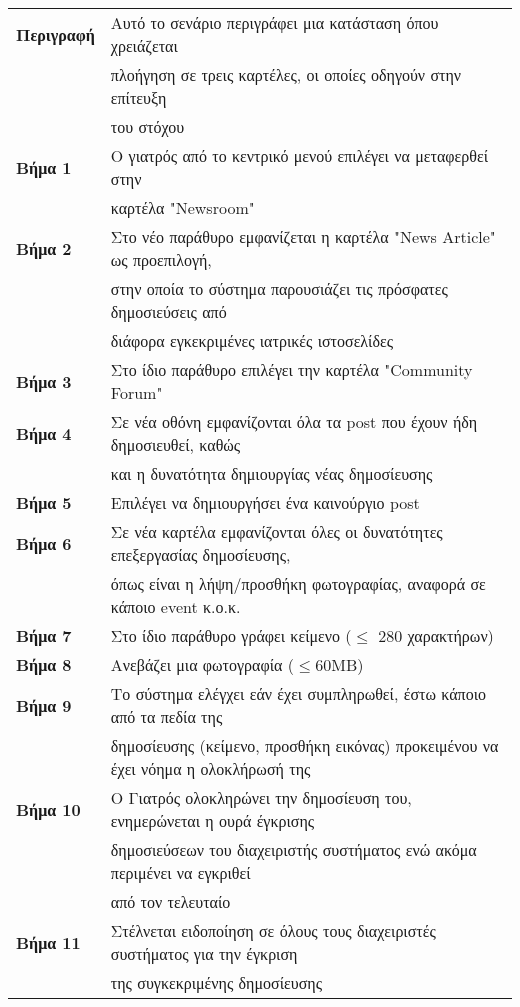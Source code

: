 \documentclass{article}
\newcommand\T{\rule{0pt}{2.6ex}}       %
\newcommand\B{\rule[-1.2ex]{0pt}{0pt}}
\begin{document}
 \begin{center}
     \begin{tabular}{|l|l|}
     \hline
      \textbf{Περιγραφή} & Αυτό το σενάριο περιγράφει μια κατάσταση όπου χρειάζεται \T \\& πλοήγηση σε τρεις καρτέλες, οι οποίες οδηγούν στην επίτευξη \\& του στόχου \B \\ 
      \hline
      \textbf{Βήμα 1} & Ο γιατρός από το κεντρικό μενού επιλέγει να μεταφερθεί στην \T \\& καρτέλα "Newsroom" \T\B \\
      \hline
      \textbf{Βήμα 2} & Στο νέο παράθυρο εμφανίζεται η καρτέλα "News Article" ως προεπιλογή, \T \\& στην οποία το σύστημα παρουσιάζει τις πρόσφατες δημοσιεύσεις από \\& διάφορα εγκεκριμένες ιατρικές ιστοσελίδες \B \\
      \hline
      \textbf{Βήμα 3} & Στο ίδιο παράθυρο επιλέγει την καρτέλα "Community Forum" \T\B \\
      \hline
      \textbf{Βήμα 4} & Σε νέα οθόνη εμφανίζονται όλα τα post που έχουν ήδη δημοσιευθεί, καθώς \T \\& και η δυνατότητα δημιουργίας νέας δημοσίευσης \B \\
      \hline
      \textbf{Βήμα 5} & Επιλέγει να δημιουργήσει ένα καινούργιο post \T\B \\
      \hline
      \textbf{Βήμα 6} & Σε νέα καρτέλα εμφανίζονται όλες οι δυνατότητες επεξεργασίας δημοσίευσης,\T \\& όπως είναι η λήψη/προσθήκη φωτογραφίας, αναφορά σε κάποιο event κ.ο.κ. \B \\
      \hline
      \textbf{Βήμα 7} & Στο ίδιο παράθυρο γράφει κείμενο ($\le$ 280 χαρακτήρων) \T\B \\
      \hline
      \textbf{Βήμα 8} & Ανεβάζει μια φωτογραφία ($\le$60MB) \T\B \\
      \hline
      \textbf{Βήμα 9} & Το σύστημα ελέγχει εάν έχει συμπληρωθεί, έστω κάποιο από τα πεδία της \T\\& δημοσίευσης (κείμενο, προσθήκη εικόνας) προκειμένου να έχει νόημα η ολοκλήρωσή της \B \\
      \hline
      \textbf{Βήμα 10} & Ο Γιατρός ολοκληρώνει την δημοσίευση του, ενημερώνεται η ουρά έγκρισης \T \\& δημοσιεύσεων του διαχειριστής συστήματος ενώ ακόμα περιμένει να εγκριθεί \\& από τον τελευταίο \B \\
      \hline     
      \textbf{Βήμα 11} & Στέλνεται ειδοποίηση σε όλους τους διαχειριστές συστήματος για την έγκριση \T \\& της συγκεκριμένης δημοσίευσης \B \\
      \hline 
     \end{tabular}
 \end{center}
 
\end{document}
